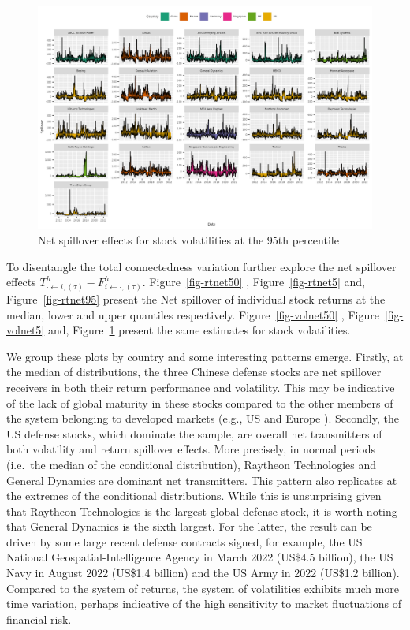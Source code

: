 \documentclass[
  number]{elsarticle}
\begin{document}
\begin{figure}[H]

{\centering \includegraphics{plots/fig-volnet95.png}

}

\caption{\label{fig-volnet95}Net spillover effects for stock
volatilities at the 95th percentile}

\end{figure}

To disentangle the total connectedness variation further explore the net
spillover effects
\(T_{\cdot \leftarrow i,(\tau)}^h -F_{i \leftarrow \cdot,(\tau)}^h\).
Figure~\ref{fig-rtnet50} , Figure~\ref{fig-rtnet5} and,
Figure~\ref{fig-rtnet95} present the Net spillover of individual stock
returns at the median, lower and upper quantiles respectively.
Figure~\ref{fig-volnet50} , Figure~\ref{fig-volnet5} and,
Figure~\ref{fig-volnet95} present the same estimates for stock
volatilities.

We group these plots by country and some interesting patterns emerge.
Firstly, at the median of distributions, the three Chinese defense
stocks are net spillover receivers in both their return performance and
volatility. This may be indicative of the lack of global maturity in
these stocks compared to the other members of the system belonging to
developed markets (e.g., US and Europe ). Secondly, the US defense
stocks, which dominate the sample, are overall net transmitters of both
volatility and return spillover effects. More precisely, in normal
periods (i.e.~the median of the conditional distribution), Raytheon
Technologies and General Dynamics are dominant net transmitters. This
pattern also replicates at the extremes of the conditional
distributions. While this is unsurprising given that Raytheon
Technologies is the largest global defense stock, it is worth noting
that General Dynamics is the sixth largest. For the latter, the result
can be driven by some large recent defense contracts signed, for
example, the US National Geospatial-Intelligence Agency in March 2022
(US\$4.5 billion), the US Navy in August 2022 (US\$1.4 billion) and the
US Army in 2022 (US\$1.2 billion). Compared to the system of returns,
the system of volatilities exhibits much more time variation, perhaps
indicative of the high sensitivity to market fluctuations of financial
risk.
\end{document}

